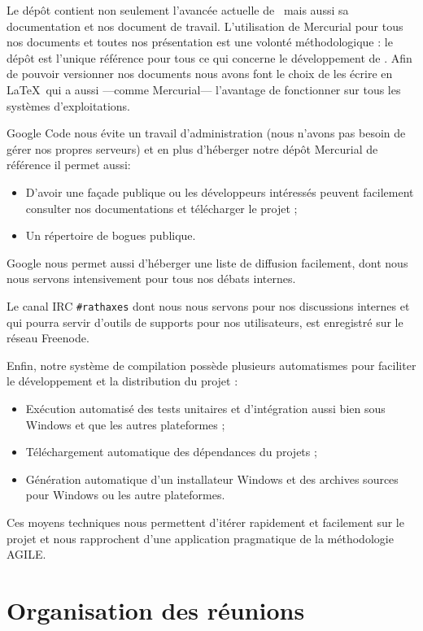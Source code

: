 \documentclass[francais]{rtxreport}
\begin{document}
Le dépôt contient non seulement l'avancée actuelle de \rtx\ mais aussi sa
documentation et nos document de travail. L'utilisation de Mercurial pour tous
nos documents et toutes nos présentation est une volonté méthodologique : le
dépôt est l'unique référence pour tous ce qui concerne le développement de \rtx.
Afin de pouvoir versionner nos documents nous avons font le choix de les écrire
en \LaTeX\ qui a aussi ---comme Mercurial--- l'avantage de fonctionner sur tous
les systèmes d'exploitations.

Google Code nous évite un travail d'administration (nous n'avons pas besoin de
gérer nos propres serveurs) et en plus d'héberger notre dépôt Mercurial de
référence il permet aussi:
\begin{itemize}
\item D'avoir une façade publique ou les développeurs intéressés peuvent
  facilement consulter nos documentations et télécharger le projet ;
\item Un répertoire de bogues publique.
\end{itemize}
Google nous permet aussi d'héberger une liste de diffusion facilement, dont nous
nous servons intensivement pour tous nos débats internes.

Le canal IRC \texttt{\#rathaxes} dont nous nous servons pour nos discussions
internes et qui pourra servir d'outils de supports pour nos utilisateurs, est
enregistré sur le réseau Freenode.

Enfin, notre système de compilation possède plusieurs automatismes pour
faciliter le développement et la distribution du projet :
\begin{itemize}
\item Exécution automatisé des tests unitaires et d'intégration aussi bien sous
  Windows et que les autres plateformes ;
\item Téléchargement automatique des dépendances du projets ;
\item Génération automatique d'un installateur Windows et des archives sources
  pour Windows ou les autre plateformes.
\end{itemize}

Ces moyens techniques nous permettent d'itérer rapidement et facilement sur le
projet et nous rapprochent d'une application pragmatique de la méthodologie
AGILE.

\section{Organisation des réunions}
\end{document}
